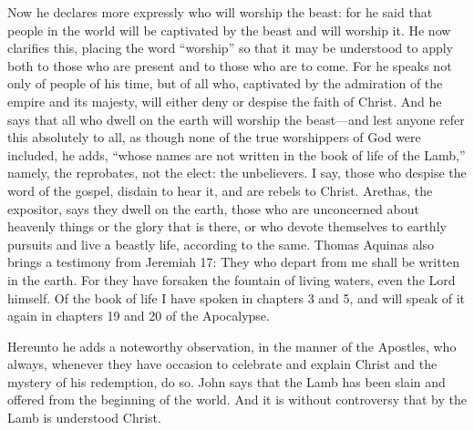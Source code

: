 Now he declares more expressly who will worship the beast: for he said that people in the world will be captivated by the beast and will worship it. He now clarifies this, placing the word “worship” so that it may be understood to apply both to those who are present and to those who are to come. For he speaks not only of people of his time, but of all who, captivated by the admiration of the empire and its majesty, will either deny or despise the faith of Christ. And he says that all who dwell on the earth will worship the beast—and lest anyone refer this absolutely to all, as though none of the true worshippers of God were included, he adds, “whose names are not written in the book of life of the Lamb,” namely, the reprobates, not the elect: the unbelievers. I say, those who despise the word of the gospel, disdain to hear it, and are rebels to Christ. Arethas, the expositor, says they dwell on the earth, those who are unconcerned about heavenly things or the glory that is there, or who devote themselves to earthly pursuits and live a beastly life, according to the same. Thomas Aquinas also brings a testimony from Jeremiah 17: They who depart from me shall be written in the earth. For they have forsaken the fountain of living waters, even the Lord himself. Of the book of life I have spoken in chapters 3 and 5, and will speak of it again in chapters 19 and 20 of the Apocalypse.

Hereunto he adds a noteworthy observation, in the manner of the Apostles, who always, whenever they have occasion to celebrate and explain Christ and the mystery of his redemption, do so. John says that the Lamb has been slain and offered from the beginning of the world. And it is without controversy that by the Lamb is understood Christ.

